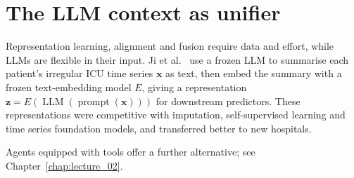 \section{The LLM context as unifier}
\label{sec:unifier}

Representation learning, alignment and fusion require data and effort, while
LLMs are flexible in their input. Ji et al.~\cite{ji2026portable} use a frozen LLM
to summarise each patient's irregular ICU time series $\mathbf{x}$ as text, then
embed the summary with a frozen text-embedding model $E$, giving a
representation $\mathbf{z} = E\left(\operatorname{LLM}(\operatorname{prompt}(\mathbf{x}))\right)$
for downstream predictors. These
representations were competitive with imputation, self-supervised learning and
time series foundation models, and transferred better to new hospitals.

Agents equipped with tools offer a further alternative; see
Chapter~\ref{chap:lecture_02}.

